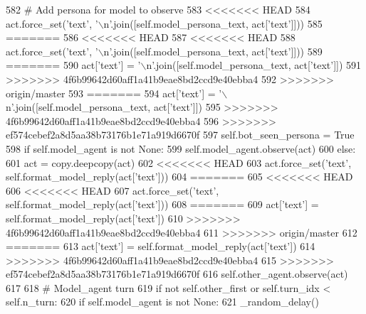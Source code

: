 \begin{DoxyCode}
582             \textcolor{comment}{# Add persona for model to observe}
583 <<<<<<< HEAD
584             act.force\_set(\textcolor{stringliteral}{'text'}, \textcolor{stringliteral}{'\(\backslash\)n'}.join([self.model\_persona\_text, act[\textcolor{stringliteral}{'text'}]]))
585 =======
586 <<<<<<< HEAD
587 <<<<<<< HEAD
588             act.force\_set(\textcolor{stringliteral}{'text'}, \textcolor{stringliteral}{'\(\backslash\)n'}.join([self.model\_persona\_text, act[\textcolor{stringliteral}{'text'}]]))
589 =======
590             act[\textcolor{stringliteral}{'text'}] = \textcolor{stringliteral}{'\(\backslash\)n'}.join([self.model\_persona\_text, act[\textcolor{stringliteral}{'text'}]])
591 >>>>>>> 4f6b99642d60aff1a41b9eae8bd2ccd9e40ebba4
592 >>>>>>> origin/master
593 =======
594             act[\textcolor{stringliteral}{'text'}] = \textcolor{stringliteral}{'\(\backslash\)n'}.join([self.model\_persona\_text, act[\textcolor{stringliteral}{'text'}]])
595 >>>>>>> 4f6b99642d60aff1a41b9eae8bd2ccd9e40ebba4
596 >>>>>>> ef574cebef2a8d5aa38b73176b1e71a919d6670f
597             self.bot\_seen\_persona = \textcolor{keyword}{True}
598         \textcolor{keywordflow}{if} self.model\_agent \textcolor{keywordflow}{is} \textcolor{keywordflow}{not} \textcolor{keywordtype}{None}:
599             self.model\_agent.observe(act)
600         \textcolor{keywordflow}{else}:
601             act = copy.deepcopy(act)
602 <<<<<<< HEAD
603             act.force\_set(\textcolor{stringliteral}{'text'}, self.format\_model\_reply(act[\textcolor{stringliteral}{'text'}]))
604 =======
605 <<<<<<< HEAD
606 <<<<<<< HEAD
607             act.force\_set(\textcolor{stringliteral}{'text'}, self.format\_model\_reply(act[\textcolor{stringliteral}{'text'}]))
608 =======
609             act[\textcolor{stringliteral}{'text'}] = self.format\_model\_reply(act[\textcolor{stringliteral}{'text'}])
610 >>>>>>> 4f6b99642d60aff1a41b9eae8bd2ccd9e40ebba4
611 >>>>>>> origin/master
612 =======
613             act[\textcolor{stringliteral}{'text'}] = self.format\_model\_reply(act[\textcolor{stringliteral}{'text'}])
614 >>>>>>> 4f6b99642d60aff1a41b9eae8bd2ccd9e40ebba4
615 >>>>>>> ef574cebef2a8d5aa38b73176b1e71a919d6670f
616             self.other\_agent.observe(act)
617 
618         \textcolor{comment}{# Model\_agent turn}
619         \textcolor{keywordflow}{if} \textcolor{keywordflow}{not} self.other\_first \textcolor{keywordflow}{or} self.turn\_idx < self.n\_turn:
620             \textcolor{keywordflow}{if} self.model\_agent \textcolor{keywordflow}{is} \textcolor{keywordflow}{not} \textcolor{keywordtype}{None}:
621                 \_random\_delay()

\end{DoxyCode}
